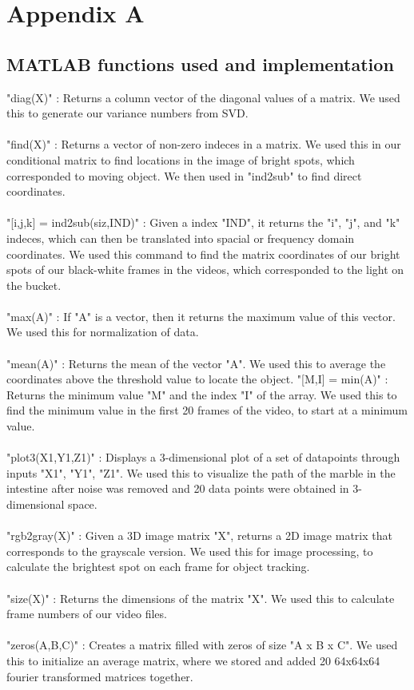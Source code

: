 \documentclass{article}
\begin{document}
\section*{\fontsize{19}{15}\selectfont Appendix A}
\subsection*{MATLAB functions used and implementation}
"diag(X)" : Returns a column vector of the diagonal values of a matrix. We used this to generate our variance numbers from SVD. \\ \\
"find(X)" : Returns a vector of non-zero indeces in a matrix. We used this in our conditional matrix to find locations in the image of bright spots, which corresponded to moving object. We then used in "ind2sub" to find direct coordinates.  \\ \\
"[i,j,k] = ind2sub(siz,IND)" : Given a index "IND", it returns the "i", "j", and "k" indeces, which can then be translated into spacial or frequency domain coordinates. We used this command to find the matrix coordinates of our bright spots of our black-white frames in the videos, which corresponded to the light on the bucket. \\ \\
"max(A)" : If "A" is a vector, then it returns the maximum value of this vector. We used this for normalization of data. \\ \\
"mean(A)" : Returns the mean of the vector "A". We used this to average the coordinates above the threshold value to locate the object.
"[M,I] = min(A)" : Returns the minimum value "M" and the index "I" of the array. We used this to find the minimum value in the first 20 frames of the video, to start at a minimum value. \\ \\
"plot3(X1,Y1,Z1)" : Displays a 3-dimensional plot of a set of datapoints through inputs "X1", "Y1", "Z1". We used this to visualize the path of the marble in the intestine after noise was removed and 20 data points were obtained in 3-dimensional space. \\ \\
"rgb2gray(X)" : Given a 3D image matrix "X", returns a 2D image matrix that corresponds to the grayscale version. We used this for image processing, to calculate the brightest spot on each frame for object tracking. \\ \\
"size(X)" : Returns the dimensions of the matrix "X". We used this to calculate frame numbers of our video files. \\ \\
"zeros(A,B,C)" : Creates a matrix filled with zeros of size "A x B x C". We used this to initialize an average matrix, where we stored and added 20 64x64x64 fourier transformed matrices together. \\ \\
\end{document}
